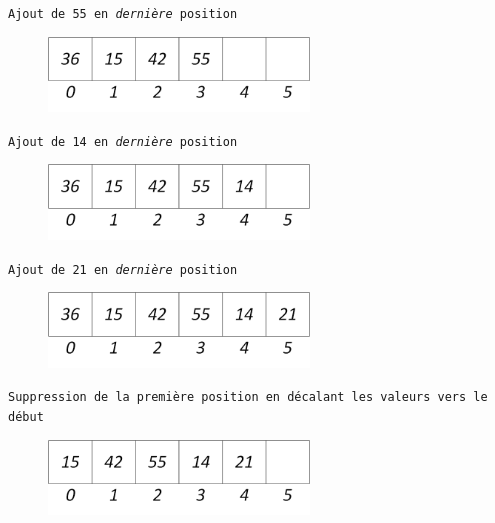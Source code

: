 \documentclass[11pt,a4paper]{article}
\begin{document}
\begin{center}

\texttt{Ajout de 55 en \textit{dernière} position}

\begin{figure}[ht!]
\centering
\centerline{  %
\includegraphics[height=2cm]{img/f-1-Liste_t_4.png}
}
\end{figure}


\texttt{Ajout de 14 en \textit{dernière} position}

\begin{figure}[ht!]
\centering
\centerline{  %
\includegraphics[height=2cm]{img/f-2-Liste_t_5.png}
}
\end{figure}


\texttt{Ajout de 21 en \textit{dernière} position}

\begin{figure}[ht!]
\centering
\centerline{  %
\includegraphics[height=2cm]{img/f-3-Liste_t_6.png}
}
\end{figure}


\texttt{Suppression de la première position en décalant les valeurs vers le début}

\begin{figure}[ht!]
\centering
\centerline{  %
\includegraphics[height=2cm]{img/f-4-Liste_t_5.png}
}
\end{figure}



\end{center}
\end{document}
